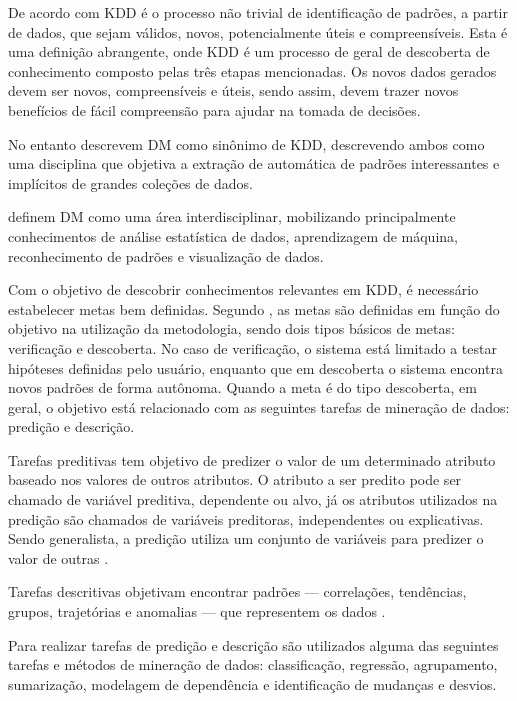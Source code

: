 De acordo com  KDD é o processo não trivial de
identificação de padrões, a partir de dados, que sejam válidos, novos,
potencialmente úteis e compreensíveis. Esta é uma definição abrangente, onde KDD
é um processo de geral de descoberta de conhecimento composto pelas três etapas
mencionadas. Os novos dados gerados devem ser novos, compreensíveis e úteis,
sendo assim, devem trazer novos benefícios de fácil compreensão para ajudar na
tomada de decisões.

No entanto  descrevem DM como sinônimo de KDD,
descrevendo ambos como uma disciplina que objetiva a extração de automática de
padrões interessantes e implícitos de grandes coleções de dados.

 definem DM como uma área interdisciplinar,
mobilizando principalmente conhecimentos de análise estatística de dados,
aprendizagem de máquina, reconhecimento de padrões e visualização de dados.

Com o objetivo de descobrir conhecimentos relevantes em KDD, é necessário
estabelecer metas bem definidas. Segundo , as metas
são definidas em função do objetivo na utilização da metodologia, sendo dois
tipos básicos de metas: verificação e descoberta. No caso de verificação, o
sistema está limitado a testar hipóteses definidas pelo usuário, enquanto que em
descoberta o sistema encontra novos padrões de forma autônoma. Quando a meta é
do tipo descoberta, em geral, o objetivo está relacionado com as seguintes
tarefas de mineração de dados: predição e descrição.

Tarefas preditivas tem objetivo de predizer o valor de um determinado atributo
baseado nos valores de outros atributos. O atributo a ser predito pode ser
chamado de variável preditiva, dependente ou alvo, já os atributos utilizados na
predição são chamados de variáveis preditoras, independentes ou explicativas.
Sendo generalista, a predição utiliza um conjunto de variáveis para predizer o
valor de outras \cite{fayyad1996data}.

Tarefas descritivas objetivam encontrar padrões --- correlações, tendências,
grupos, trajetórias e anomalias --- que representem os dados
\cite{fayyad1996data}.

Para realizar tarefas de predição e descrição são utilizados alguma das
seguintes tarefas e métodos de mineração de dados: classificação, regressão,
agrupamento, sumarização, modelagem de dependência e identificação de mudanças e
desvios.

